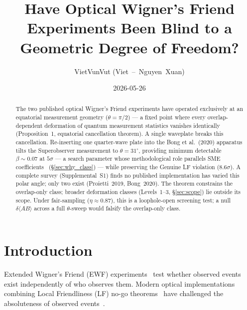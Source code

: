 \documentclass[twocolumn,aps,pra,superscriptaddress,floatfix,10pt]{revtex4-2}
\begin{document}
\title{Have Optical Wigner's Friend Experiments Been Blind to a Geometric Degree of Freedom?}

\author{VietVunVut (Viet~--~Nguyen~Xuan)}

\date{2026-05-26}

\begin{abstract}
The two published optical Wigner's Friend experiments have operated
exclusively at an equatorial measurement geometry ($\theta = \pi/2$) --- a fixed
point where every overlap-dependent deformation of quantum measurement
statistics vanishes identically (Proposition~1, equatorial cancellation
theorem). A single waveplate breaks this cancellation. Re-inserting one
quarter-wave plate into the Bong et al.\ (2020) apparatus tilts the
Superobserver measurement to $\theta = 31^\circ$, providing minimum detectable
$\beta \sim 0.07$ at $5\sigma$ --- a search parameter whose methodological role parallels
SME coefficients~\cite{Colladay1997} (\S\ref{sec:why_class}) --- while preserving the Genuine LF violation
($8.6\sigma$). A complete survey (Supplemental~S1) finds no published
implementation has varied this polar angle; only two exist (Proietti~2019,
Bong~2020). The theorem constrains the overlap-only class; broader
deformation classes (Levels~1--3, \S\ref{sec:scope}) lie outside its scope. Under
fair-sampling ($\eta \approx 0.87$), this is a loophole-open screening test; a null
$\delta\langle AB\rangle$ across a full $\theta$-sweep would falsify the overlap-only class.
\end{abstract}

\maketitle

\section{Introduction}
\label{sec:intro}

Extended Wigner's Friend (EWF) experiments~\cite{Proietti2019,Bong2020} test whether observed events
exist independently of who observes them. Modern optical implementations
combining Local Friendliness (LF) no-go theorems~\cite{Bong2020,Wiseman2023,Haddara2024a} have challenged the
absoluteness of observed events~\cite{Haddara2023b,Kent2023}.
\end{document}
